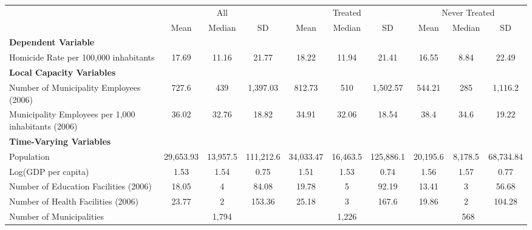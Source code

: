 \documentclass{article}
\begin{document}
\begin{table}[!htbp]
\centering
\begin{adjustbox}{max width=\textwidth}
\begin{tabular}{lccccccccc}
\toprule
& \multicolumn{3}{c}{All} & \multicolumn{3}{c}{Treated} & \multicolumn{3}{c}{Never Treated} \\
\cmidrule(lr){2-4} \cmidrule(lr){5-7} \cmidrule(lr){8-10}
& Mean & Median & SD & Mean & Median & SD & Mean & Median & SD \\
\midrule
\multicolumn{10}{l}{\textbf{Dependent Variable}} \\
Homicide Rate per 100,000 inhabitants & 17.69 & 11.16 & 21.77 & 18.22 & 11.94 & 21.41 & 16.55 & 8.84 & 22.49 \\[0.5em]
\midrule
\multicolumn{10}{l}{\textbf{Local Capacity Variables}} \\
Number of Municipality Employees (2006) & 727.6 & 439 & 1,397.03 & 812.73 & 510 & 1,502.57 & 544.21 & 285 & 1,116.2 \\
Municipality Employees per 1,000 inhabitants (2006) & 36.02 & 32.76 & 18.82 & 34.91 & 32.06 & 18.54 & 38.4 & 34.6 & 19.22 \\[0.5em]
\midrule
\multicolumn{10}{l}{\textbf{Time-Varying Variables}} \\
Population & 29,653.93 & 13,957.5 & 111,212.6 & 34,033.47 & 16,463.5 & 125,886.1 & 20,195.6 & 8,178.5 & 68,734.84 \\
Log(GDP per capita) & 1.53 & 1.54 & 0.75 & 1.51 & 1.53 & 0.74 & 1.56 & 1.57 & 0.77 \\
Number of Education Facilities (2006) & 18.05 & 4 & 84.08 & 19.78 & 5 & 92.19 & 13.41 & 3 & 56.68 \\
Number of Health Facilities (2006) & 23.77 & 2 & 153.36 & 25.18 & 3 & 167.6 & 19.86 & 2 & 104.28 \\
\midrule
Number of Municipalities & \multicolumn{3}{c}{1,794} & \multicolumn{3}{c}{1,226} & \multicolumn{3}{c}{568} \\
\bottomrule
\end{tabular}
\end{adjustbox}
\end{table}
\end{document}
